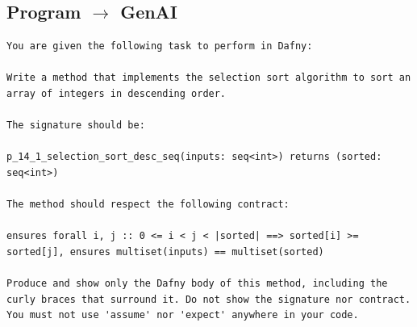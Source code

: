\documentclass{article}
\begin{document}
\subsection*{Program $\rightarrow$ GenAI}
\begin{lstlisting}
You are given the following task to perform in Dafny:

Write a method that implements the selection sort algorithm to sort an array of integers in descending order.

The signature should be:

p_14_1_selection_sort_desc_seq(inputs: seq<int>) returns (sorted: seq<int>)

The method should respect the following contract:

ensures forall i, j :: 0 <= i < j < |sorted| ==> sorted[i] >= sorted[j], ensures multiset(inputs) == multiset(sorted)

Produce and show only the Dafny body of this method, including the curly braces that surround it. Do not show the signature nor contract. You must not use 'assume' nor 'expect' anywhere in your code.
\end{lstlisting}
\end{document}
